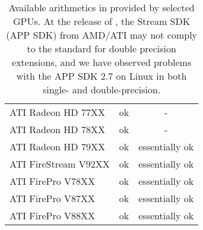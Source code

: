 \begin{table}[tb]
\begin{center}
\begin{tabular}{l|c|c}
ATI Radeon HD 77XX   & ok & - \\
ATI Radeon HD 78XX   & ok & - \\
ATI Radeon HD 79XX   & ok & essentially ok \\
ATI FireStream V92XX & ok & essentially ok \\
ATI FirePro V78XX    & ok & essentially ok \\
ATI FirePro V87XX    & ok & essentially ok \\
ATI FirePro V88XX    & ok & essentially ok \\
\end{tabular}
\caption{Available arithmetics in {\ViennaCL} provided by selected GPUs. At the
release of {\ViennaCLversion}, the Stream SDK (APP SDK) from AMD/ATI may not comply to
the {\OpenCL} standard for double precision extensions, and we have observed
problems with the APP SDK 2.7 on Linux in both single- and double-precision.}
\label{tab:double-precision-GPUs}
\end{center}
\end{table}
